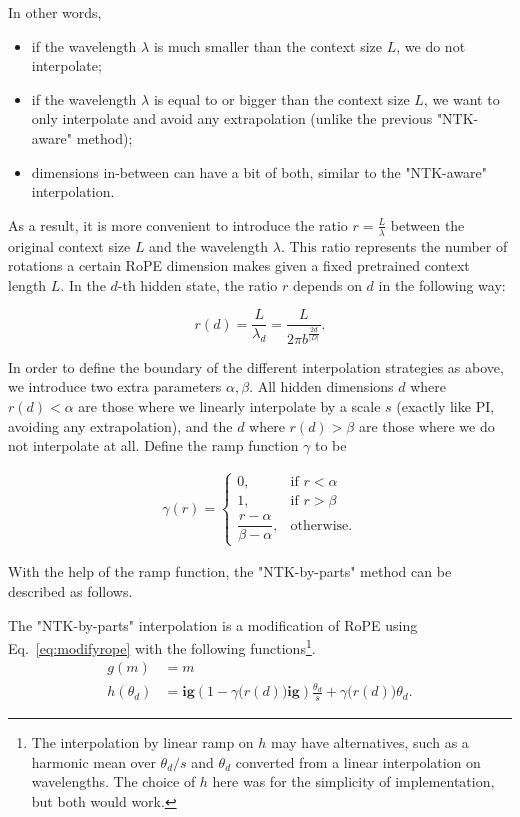 In other words,

\begin{itemize}
\item if the wavelength $\lambda$ is much smaller than the context size $L$, we do not interpolate; 
\item if the wavelength $\lambda$ is equal to or bigger than the context size $L$, we want to only interpolate and avoid any extrapolation (unlike the previous "NTK-aware" method);
\item dimensions in-between can have a bit of both, similar to the "NTK-aware" interpolation.
\end{itemize}

As a result, it is more convenient to introduce the ratio $r = \frac{L}{\lambda}$ between the original context size $L$ and the wavelength $\lambda$. This ratio represents the number of rotations a certain RoPE dimension makes given a fixed pretrained context length $L$. In the $d$-th hidden state, the ratio $r$ depends on $d$ in the following way:

\begin{equation}
    r(d) = \dfrac{L}{\lambda_d} = \dfrac{L}{2\pi b^{\frac{2d}{|D|}}}.
\end{equation}

In order to define the boundary of the different interpolation strategies as above, we introduce two extra parameters $\alpha, \beta$. All hidden dimensions $d$ where $r(d) < \alpha$ are those where we linearly interpolate by a scale $s$ (exactly like PI, avoiding any extrapolation), and the $d$ where $r(d) > \beta$ are those where we do not interpolate at all. Define the ramp function $\gamma$ to be

\begin{align}
\gamma(r) = 
\begin{cases}
    0, &\text{if } r < \alpha\\ 1, &\text{if } r > \beta\\
    \dfrac{r - \alpha}{\beta - \alpha}, &\text{otherwise}.
\end{cases}
\end{align}

With the help of the ramp function, the "NTK-by-parts" method can be described as follows.

\begin{definition}
The "NTK-by-parts" interpolation is a modification of RoPE using Eq.~\ref{eq:modifyrope} with the following functions\footnote{The interpolation by linear ramp on $h$ may have alternatives, such as a harmonic mean over $\theta_d/s$ and $\theta_d$ converted from a linear interpolation on wavelengths. The choice of $h$ here was for the simplicity of implementation, but both would work.}.
    \begin{align}
    g(m) &= m\\
    h(\theta_d) &= 
    \mathbf{ig}(1-\gamma\big(r(d)\big)\mathbf{ig}) \frac{\theta_d}{s} + \gamma\big(r(d)\big) \theta_d.
\end{align}
\end{definition}

